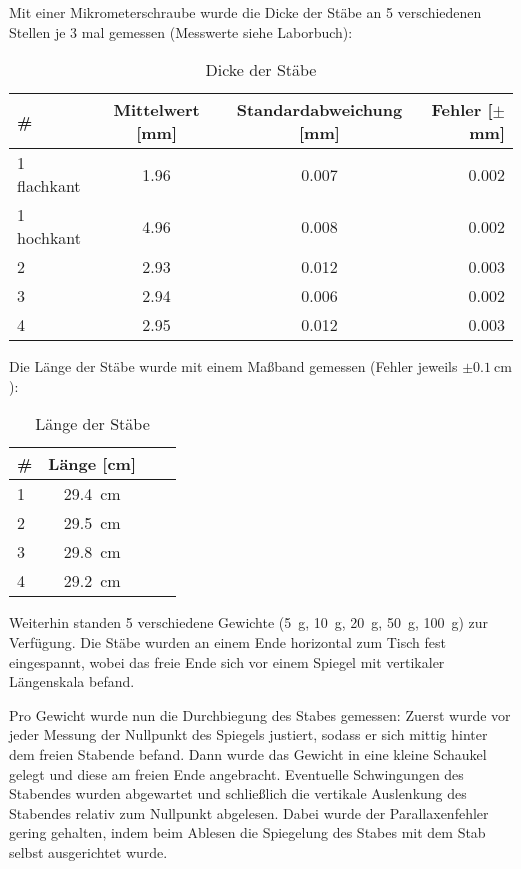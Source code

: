 Mit einer Mikrometerschraube wurde die Dicke der Stäbe an 5 verschiedenen Stellen je 3 mal gemessen (Messwerte siehe Laborbuch):
\begin{table}[H]
  \centering
  \begin{tabular}{l | c | c | r}
    \# & Mittelwert [mm] & Standardabweichung [mm] & Fehler [$\pm$mm] \\ \hline
    1 flachkant & \num{1.96} & \num{0.007} & \num{0.002} \\
    1 hochkant & \num{4.96} & \num{0.008} & \num{0.002} \\
    2 & \num{2.93} & \num{0.012} & \num{0.003} \\
    3 & \num{2.94} & \num{0.006} & \num{0.002} \\
    4 & \num{2.95} & \num{0.012} & \num{0.003}
  \end{tabular}
  \caption{Dicke der Stäbe}
  \label{tab:stabdicke}
\end{table}

Die Länge der Stäbe wurde mit einem Maßband gemessen (Fehler jeweils $\pm \SI{0.1}{\cm}$):
\begin{table}[H]
  \centering
  \begin{tabular}{l | c | c | r}
    \# & Länge [cm] \\ \hline
    1 & \SI{29.4}{\cm} \\
    2 & \SI{29.5}{\cm} \\
    3 & \SI{29.8}{\cm} \\
    4 & \SI{29.2}{\cm}
  \end{tabular}
  \caption{Länge der Stäbe}
  \label{tab:stablänge}
\end{table}

Weiterhin standen 5 verschiedene Gewichte (\SI{5}{g}, \SI{10}{g}, \SI{20}{g}, \SI{50}{g}, \SI{100}{g}) zur Verfügung. Die Stäbe wurden an einem Ende horizontal zum Tisch fest eingespannt, wobei das freie Ende sich vor einem Spiegel mit vertikaler Längenskala befand. 

Pro Gewicht wurde nun die Durchbiegung des Stabes gemessen: Zuerst wurde vor jeder Messung der Nullpunkt des Spiegels justiert, sodass er sich mittig hinter dem freien Stabende befand. Dann wurde das Gewicht in eine kleine Schaukel gelegt und diese am freien Ende angebracht. Eventuelle Schwingungen des Stabendes wurden abgewartet und schließlich die vertikale Auslenkung des Stabendes relativ zum Nullpunkt abgelesen. Dabei wurde der Parallaxenfehler gering gehalten, indem beim Ablesen die Spiegelung des Stabes mit dem Stab selbst ausgerichtet wurde.

